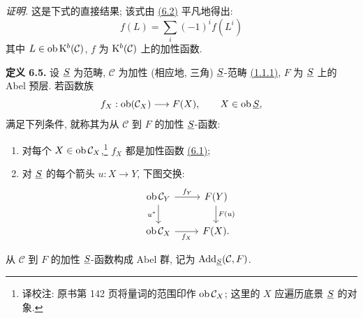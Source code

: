 \emph{证明.} 这是下式的直接结果; 该式由 \hyperlink{sga6.e01.para.6-2}{(6.2)} 平凡地得出:
\begin{equation}\tag{6.4.1}
  f(L)=\sum_i (-1)^i f(L^i)
\end{equation}
其中 \(L\in\operatorname{ob}\mathrm K^b(\mathcal C)\), \(f\) 为 \(\mathrm K^b(\mathcal C)\) 上的加性函数.

\textbf{定义 6.5.} 设 \(\underline S\) 为范畴, \(\mathcal C\) 为加性 (相应地, 三角) \(\underline S\)-范畴 \hyperlink{sga6.e01.para.1-1-1}{(1.1.1)}, \(F\) 为 \(\underline S\) 上的 Abel 预层. 若函数族
\[
  f_X:\operatorname{ob}(\mathcal C_X)\longrightarrow F(X),
  \qquad X\in\operatorname{ob}\underline S,
\]
满足下列条件, 就称其为从 \(\mathcal C\) 到 \(F\) 的加性 \(\underline S\)-函数:
\begin{enumerate}[label=(\roman*)]
\item 对每个 \(X\in\operatorname{ob}\mathcal C_X\),\footnote{译校注: 原书第 142 页将量词的范围印作 \(\operatorname{ob}\mathcal C_X\); 这里的 \(X\) 应遍历底景 \(\underline S\) 的对象.} \(f_X\) 都是加性函数 \hyperlink{sga6.e01.def.6-1}{(6.1)};
\item 对 \(\underline S\) 的每个箭头 \(u:X\to Y\), 下图交换:
\[
\begin{tikzcd}
\Ob\mathcal C_Y \arrow[r,"f_Y"] \arrow[d,"u^*"'] & F(Y) \arrow[d,"F(u)"]\\
\Ob\mathcal C_X \arrow[r,"f_X"'] & F(X).
\end{tikzcd}
\]
\end{enumerate}
从 \(\mathcal C\) 到 \(F\) 的加性 \(\underline S\)-函数构成 Abel 群, 记为 \(\operatorname{Add}_{\underline S}(\mathcal C,F)\).


